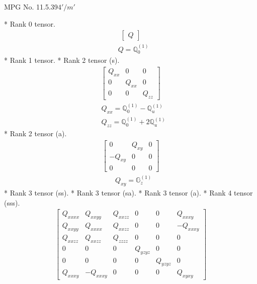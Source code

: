 \documentclass[fleqn,8pt,landscape]{jsarticle}
\begin{document}
\setcounter{MaxMatrixCols}{32}

\renewcommand{\tablename}{Table~}
\renewcommand{\figurename}{Figure~}
\begin{center}
\LARGE
MPG No. 11.5.39\quad$4'/m'$
\end{center}
* Rank 0 tensor.
\begin{align*}
\begin{bmatrix} Q \end{bmatrix}
\end{align*}
\begin{align*}
& Q = \mathbb{Q}_{0}^{(1)}
\end{align*}
* Rank 1 tensor.
* Rank 2 tensor (s).
\begin{align*}
\begin{bmatrix} Q_{xx} & 0 & 0 \\ 0 & Q_{xx} & 0 \\ 0 & 0 & Q_{zz} \end{bmatrix}
\end{align*}
\begin{align*}
& Q_{xx} = \mathbb{Q}_{0}^{(1)} - \mathbb{Q}_{u}^{(1)} \\
& Q_{zz} = \mathbb{Q}_{0}^{(1)} + 2 \mathbb{Q}_{u}^{(1)}
\end{align*}
* Rank 2 tensor (a).
\begin{align*}
\begin{bmatrix} 0 & Q_{xy} & 0 \\ - Q_{xy} & 0 & 0 \\ 0 & 0 & 0 \end{bmatrix}
\end{align*}
\begin{align*}
& Q_{xy} = \mathbb{G}_{z}^{(1)}
\end{align*}
* Rank 3 tensor (ss).
* Rank 3 tensor (sa).
* Rank 3 tensor (a).
* Rank 4 tensor (sss).
\begin{align*}
\begin{bmatrix} Q_{xxxx} & Q_{xxyy} & Q_{xxzz} & 0 & 0 & Q_{xxxy} \\ Q_{xxyy} & Q_{xxxx} & Q_{xxzz} & 0 & 0 & - Q_{xxxy} \\ Q_{xxzz} & Q_{xxzz} & Q_{zzzz} & 0 & 0 & 0 \\ 0 & 0 & 0 & Q_{yzyz} & 0 & 0 \\ 0 & 0 & 0 & 0 & Q_{yzyz} & 0 \\ Q_{xxxy} & - Q_{xxxy} & 0 & 0 & 0 & Q_{xyxy} \end{bmatrix}
\end{align*}
\end{document}
